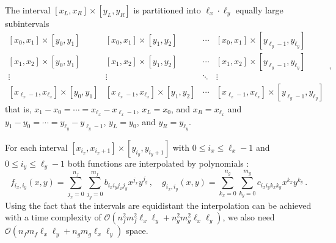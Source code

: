 The interval $[x_L,x_R]\times [y_L, y_R]$ is partitioned into $\ell_x \cdot \ell_y$ equally large subintervals
\begin{equation}
    \begin{matrix}
        [x_0, x_1]\times[y_0, y_1] & [x_0, x_1]\times[y_1, y_2] & \cdots & [x_0, x_1]\times[y_{\ell_y-1}, y_{\ell_y}] \\
        [x_1, x_2]\times[y_0, y_1] & [x_1, x_2]\times[y_1, y_2] & \cdots & [x_1, x_2]\times[y_{\ell_y-1}, y_{\ell_y}] \\
        \vdots & \vdots & \ddots & \vdots \\
        [x_{\ell_x-1}, x_{\ell_x}]\times[y_0, y_1] & [x_{\ell_x-1}, x_{\ell_x}]\times[y_1, y_2] & \cdots &  [x_{\ell_x-1}, x_{\ell_x}]\times [y_{\ell_y-1}, y_{\ell_y}]
    \end{matrix}\,,
    \nonumber
\end{equation}
that is, $x_1 - x_0 =\cdots = x_{\ell_x} - x_{\ell_x-1}$, $x_L = x_0$, and $x_R = x_{\ell_x}$ and $y_1 - y_0 = \cdots = y_{\ell_y} - y_{\ell_y-1}$, $y_L = y_0$, and $y_R = y_{\ell_y}$.

For each interval $[x_{i_x}, x_{i_x+1}]\times[y_{i_y}, y_{i_y+1}]$ with $0 \leq i_x \leq \ell_x -1$ and $0 \leq i_y \leq \ell_y -1$ both functions are interpolated by polynomials \cite{2dpol_inter}:
\begin{equation}
    f_{i_x, i_y}(x, y) = \sum_{j_x=0}^{n_f}\sum_{j_y=0}^{m_f} b_{i_xi_yj_xj_y} x^{j_x}y^{j_y} \,,  \quad
    g_{i_x, i_y}(x, y) = \sum_{k_x=0}^{n_g}\sum_{k_y=0}^{m_g} c_{i_xi_yk_xk_y} x^{k_x}y^{k_y} \,. \nonumber
\end{equation}
Using the fact that the intervals are equidistant the interpolation can be achieved with a time complexity of $\mathcal O(n_f^2m_f^2 \ell_x \ell_y + n_g^2m_g^2 \ell_x \ell_y)$, we also need $\mathcal O(n_fm_f\ell_x\ell_y + n_gm_g\ell_x\ell_y)$ space.

